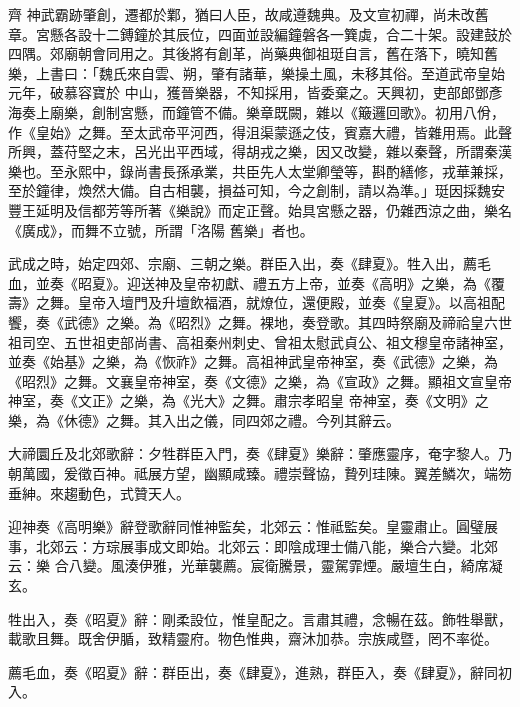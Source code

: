 
\begin{pinyinscope}

 齊
 神武霸跡肇創，遷都於鄴，猶曰人臣，故咸遵魏典。及文宣初禪，尚未改舊章。宮懸各設十二鎛鐘於其辰位，四面並設編鐘磐各一簨虡，合二十架。設建鼓於四隅。郊廟朝會同用之。其後將有創革，尚藥典御祖珽自言，舊在落下，曉知舊樂，上書曰：「魏氏來自雲、朔，肇有諸華，樂操土風，未移其俗。至道武帝皇始元年，破慕容寶於
 中山，獲晉樂器，不知採用，皆委棄之。天興初，吏部郎鄧彥海奏上廟樂，創制宮懸，而鐘管不備。樂章既闕，雜以《簸邏回歌》。初用八佾，作《皇始》之舞。至太武帝平河西，得沮渠蒙遜之伎，賓嘉大禮，皆雜用焉。此聲所興，蓋苻堅之末，呂光出平西域，得胡戎之樂，因又改變，雜以秦聲，所謂秦漢樂也。至永熙中，錄尚書長孫承業，共臣先人太堂卿瑩等，斟酌繕修，戎華兼採，至於鐘律，煥然大備。自古相襲，損益可知，今之創制，請以為準。」珽因採魏安豐王延明及信都芳等所著《樂說》而定正聲。始具宮懸之器，仍雜西涼之曲，樂名《廣成》，而舞不立號，所謂「洛陽
 舊樂」者也。



 武成之時，始定四郊、宗廟、三朝之樂。群臣入出，奏《肆夏》。牲入出，薦毛血，並奏《昭夏》。迎送神及皇帝初獻、禮五方上帝，並奏《高明》之樂，為《覆壽》之舞。皇帝入壇門及升壇飲福酒，就燎位，還便殿，並奏《皇夏》。以高祖配饗，奏《武德》之樂。為《昭烈》之舞。裸地，奏登歌。其四時祭廟及禘祫皇六世祖司空、五世祖吏部尚書、高祖秦州刺史、曾祖太慰武貞公、祖文穆皇帝諸神室，並奏《始基》之樂，為《恢祚》之舞。高祖神武皇帝神室，奏《武德》之樂，為《昭烈》之舞。文襄皇帝神室，奏《文德》之樂，為《宣政》之舞。顯祖文宣皇帝神室，奏《文正》之樂，為《光大》之舞。肅宗孝昭皇
 帝神室，奏《文明》之樂，為《休德》之舞。其入出之儀，同四郊之禮。今列其辭云。



 大禘圜丘及北郊歌辭：夕牲群臣入門，奏《肆夏》樂辭：肇應靈序，奄字黎人。乃朝萬國，爰徵百神。祗展方望，幽顯咸臻。禮崇聲協，贄列珪陳。翼差鱗次，端笏垂紳。來趨動色，式贊天人。



 迎神奏《高明樂》辭登歌辭同惟神監矣，北郊云：惟祗監矣。皇靈肅止。圓璧展事，北郊云：方琮展事成文即始。北郊云：即陰成理士備八能，樂合六變。北郊云：樂
 合八變。風湊伊雅，光華襲薦。宸衛騰景，靈駕霏煙。嚴壇生白，綺席凝玄。



 牲出入，奏《昭夏》辭：剛柔設位，惟皇配之。言肅其禮，念暢在茲。飾牲舉獸，載歌且舞。既舍伊腯，致精靈府。物色惟典，齋沐加恭。宗族咸暨，罔不率從。



 薦毛血，奏《昭夏》辭：群臣出，奏《肆夏》，進熟，群臣入，奏《肆夏》，辭同初入。




\end{pinyinscope}
